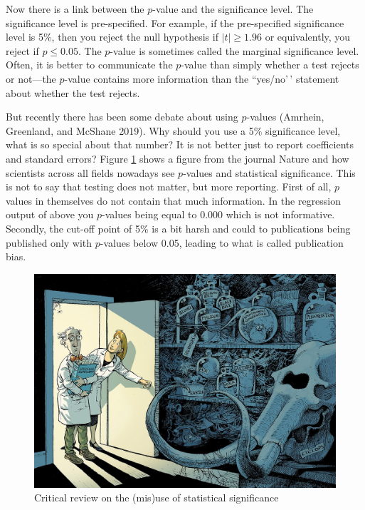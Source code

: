 \documentclass[
]{book}
\begin{document}
Now there is a link between the \(p\)-value and the significance level. The significance level is pre-specified. For example, if the pre-specified significance level is 5\%, then you reject the null hypothesis if \(|t| \geq 1.96\) or equivalently, you reject if \(p \leq 0.05\). The \(p\)-value is sometimes called the marginal significance level. Often, it is better to communicate the \(p\)-value than simply whether a test rejects or not---the \(p\)-value contains more information than the ``yes/no'\,' statement about whether the test rejects.

But recently there has been some debate about using \(p\)-values (Amrhein, Greenland, and McShane 2019). Why should you use a 5\% significance level, what is so special about that number? It is not better just to report coefficients and standard errors? Figure \ref{fig:significance} shows a figure from the journal Nature and how scientists across all fields nowadays see \(p\)-values and statistical significance. This is not to say that testing does not matter, but more reporting. First of all, \(p\) values in themselves do not contain that much information. In the regression output of above you \(p\)-values being equal to 0.000 which is not informative. Secondly, the cut-off point of 5\% is a bit harsh and could to publications being published only with \(p\)-values below 0.05, leading to what is called publication bias.

\begin{figure}

{\centering \includegraphics[width=600px]{./figures/significance} 

}

\caption{Critical review on the (mis)use of statistical significance}\label{fig:significance}
\end{figure}
\end{document}
